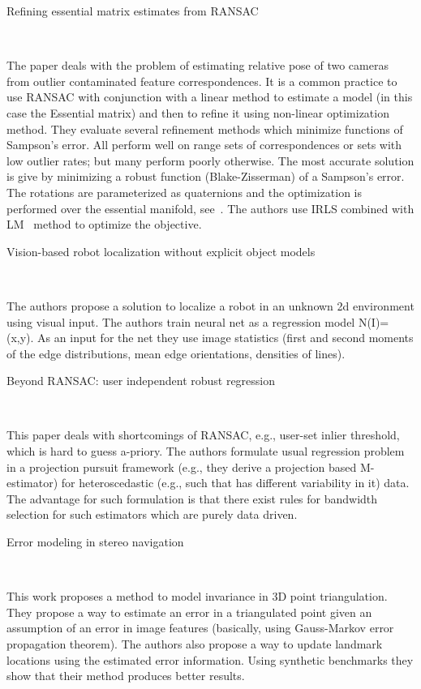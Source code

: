 \documentclass[10pt]{article}         %
\begin{document}
\begin{enumerate}
  {\Large \item Refining essential matrix estimates from
    RANSAC}~\cite{botterillrefining}

  The paper deals with the problem of estimating relative pose of two
  cameras from outlier contaminated feature correspondences.  It is a
  common practice to use RANSAC with conjunction with a linear method
  to estimate a model (in this case the Essential matrix) and then to
  refine it using non-linear optimization method. They evaluate
  several refinement methods which minimize functions of Sampson's
  error.  All perform well on range sets of correspondences or sets
  with low outlier rates; but many perform poorly otherwise.  The most
  accurate solution is give by minimizing a robust function
  (Blake-Zisserman) of a Sampson's error.  The rotations are
  parameterized as quaternions and the optimization is performed over
  the essential manifold, see~\cite{schmidt2001using}.  The authors
  use IRLS combined with LM~\cite{marquardt1963algorithm} method to
  optimize the objective.

  {\Large \item Vision-based robot localization without explicit
    object models}~\cite{dudek1996vision}

  The authors propose a solution to localize a robot in an unknown 2d
  environment using visual input. The authors train neural net as a
  regression model N(I)=(x,y).  As an input for the net they use image
  statistics (first and second moments of the edge distributions, mean
  edge orientations, densities of lines).

  {\Large \item Beyond RANSAC: user independent robust
    regression}~\cite{subbarao2006beyond}

  This paper deals with shortcomings of RANSAC, e.g., user-set inlier
  threshold, which is hard to guess a-priory.  The authors formulate
  usual regression problem in a projection pursuit framework (e.g.,
  they derive a projection based M-estimator) for heteroscedastic
  (e.g., such that has different variability in it) data.  The
  advantage for such formulation is that there exist rules for
  bandwidth selection for such estimators which are purely data
  driven.


  {\Large \item Error modeling in stereo navigation}~\cite{matthies1987error}
  
  This work proposes a method to model invariance in 3D point
  triangulation.  They propose a way to estimate an error in a
  triangulated point given an assumption of an error in image features
  (basically, using Gauss-Markov error propagation theorem).  The
  authors also propose a way to update landmark locations using the
  estimated error information.  Using synthetic benchmarks they show
  that their method produces better results.


\end{enumerate}
\end{document}
